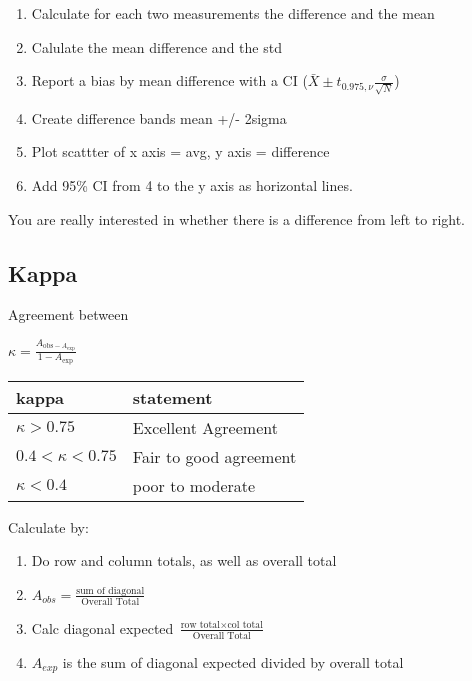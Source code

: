 \documentclass[
  letterpaper,
  DIV=11,
  numbers=noendperiod]{scrreprt}
\providecommand{\tightlist}{%
  \setlength{\itemsep}{0pt}\setlength{\parskip}{0pt}}\usepackage{longtable,booktabs,array}
\begin{document}
\begin{enumerate}
\def\labelenumi{\arabic{enumi})}
\tightlist
\item
  Calculate for each two measurements the difference and the mean
\item
  Calulate the mean difference and the std
\item
  Report a bias by mean difference with a CI
  (\(\bar{X} \pm t_{0.975, \nu} \frac{\sigma}{\sqrt{N}}\))
\item
  Create difference bands mean +/- 2sigma
\item
  Plot scattter of x axis = avg, y axis = difference
\item
  Add 95\% CI from 4 to the y axis as horizontal lines.
\end{enumerate}

You are really interested in whether there is a difference from left to
right.

\hypertarget{kappa}{%
\subsection{Kappa}\label{kappa}}

Agreement between

\(\kappa =\frac{A_{\text{obs} - A_{\text{exp}}}}{1 - A_{\text{exp}}}\)

\begin{longtable}[]{@{}ll@{}}
\toprule()
kappa & statement \\
\midrule()
\endhead
\(\kappa >0.75\) & Excellent Agreement \\
\(0.4<\kappa <0.75\) & Fair to good agreement \\
\(\kappa <0.4\) & poor to moderate \\
\bottomrule()
\end{longtable}

Calculate by:

\begin{enumerate}
\def\labelenumi{\arabic{enumi})}
\tightlist
\item
  Do row and column totals, as well as overall total
\item
  \(A_{obs} = \frac{\text{sum of diagonal}}{\text{Overall Total}}\)
\item
  Calc diagonal expected
  \(\frac{\text{row total}\times \text{col total}}{\text{Overall Total}}\)
\item
  \(A_{exp}\) is the sum of diagonal expected divided by overall total
\end{enumerate}
\end{document}
